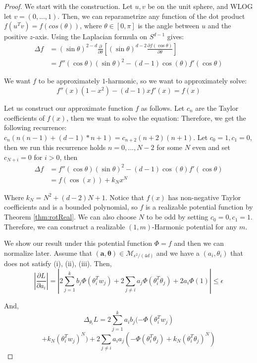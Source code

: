 \documentclass{article}
\newcommand{\pd}[2]{\frac{\partial#1}{\partial#2}}
\begin{document}
\begin{proof}
We start with the construction. Let $u,v$ be on the unit sphere, and WLOG let $v = (0,...,1)$. Then, we can reparametrize any function of the dot product $f(u^Tv) = f(cos(\theta))$, where $\theta \in [0, \pi]$ is the angle between $u$ and the positive $z$-axis.
Using the Laplacian formula on $S^{d-1}$ gives:
\begin{align*}
\Delta f & = (\sin \theta)^{2-d} \frac{\partial}{\partial \theta}\left[ (\sin \theta)^{d-2} \frac{\partial f(\cos \theta)}{\partial \theta}\right] \\
& = f''(\cos\theta)(\sin \theta)^{2} - (d-1)\cos(\theta)f'(\cos\theta)
\end{align*}

We want $f$ to be approximately $1$-harmonic, so we want to approximately solve:
%
\[f''(x)(1-x^2) - (d-1)xf'(x) =  f(x) \]

Let us construct our approximate function $f$ as follows. Let $c_n$ are the Taylor coefficients of $f(x)$, then we want to solve the equation:
Therefore, we get the following recurrence: $c_n (n(n-1) + (d-1)*n + 1) = c_{n+2} (n+2)(n+1)$. Let $c_0 = 1, c_1 = 0$, then we run this recurrence holds $n=0,...,N-2$ for some $N$ even and set $c_{N+i} = 0$ for $i > 0$, then
\begin{align*}
\Delta f & = f''(\cos\theta)(\sin \theta)^{2} - (d-1)\cos(\theta)f'(\cos\theta) \\
&= f(\cos(x)) + k_Nx^N
\end{align*}

Where $k_N = N^2 + (d-2)N + 1$. Notice that $f(x)$ has non-negative Taylor coefficients and is a bounded polynomial, so $f$ is a realizable potential function by Theorem \ref{thm:rotReal}. We can also choose $N$ to be odd by setting $c_0 = 0, c_1 = 1$. Therefore, we can construct a realizable $(1, m)$-Harmonic potential for any $m$.

We show our result under this potential function $\Phi = f$ and then we can normalize later. Assume that $(\boldsymbol{a,\theta}) \in \mathcal{M}_{\epsilon^2/(4d)}$ and we have a $(a_i,\theta_i)$ that does not satisfy (i), (ii), (iii). Then,
%
\[|\pd{L}{a_i}| = |2\sum_{j=1}^k  b_j  \Phi(\theta_i^T w_j) +  2\sum_{j\neq i} a_j \Phi(\theta_i^T\theta_j)  + 2a_i\Phi(1)| \leq \epsilon \] 

And, 
%
\[\Delta_{\theta_i} L =  2\sum_{j=1}^k a_i b_j  (-\Phi(\theta_i^T w_j) \]
\[+ k_N(\theta_i^Tw_j)^N) +  2\sum_{j\neq i} a_i a_j(-\Phi(\theta_i^T\theta_j) + k_N(\theta_i^T\theta_j)^N)\]


\end{proof}
\end{document}
